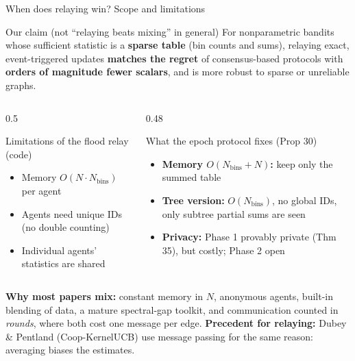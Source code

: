 \documentclass[11pt]{beamer}
\begin{document}
\begin{frame}{When does relaying win? Scope and limitations}
\scriptsize
\begin{block}{Our claim (not ``relaying beats mixing'' in general)}
For nonparametric bandits whose sufficient statistic is a \textbf{sparse table} (bin counts and sums), relaying exact, event-triggered updates \textbf{matches the regret} of consensus-based protocols with \textbf{orders of magnitude fewer scalars}, and is more robust to sparse or unreliable graphs.
\end{block}
\begin{columns}[T]
\begin{column}{0.5\textwidth}
\begin{alertblock}{Limitations of the flood relay (code)}
\begin{itemize}
\item Memory $O(N\cdot N_{\mathrm{bins}})$ per agent
\item Agents need unique IDs (no double counting)
\item Individual agents' statistics are shared
\end{itemize}
\end{alertblock}
\end{column}
\begin{column}{0.48\textwidth}
\begin{block}{What the epoch protocol fixes (Prop 30)}
\begin{itemize}
\item \textbf{Memory $O(N_{\mathrm{bins}}+N)$:} keep only the summed table
\item \textbf{Tree version:} $O(N_{\mathrm{bins}})$, no global IDs, only subtree partial sums are seen
\item \textbf{Privacy:} Phase 1 provably private (Thm 35), but costly; Phase 2 open
\end{itemize}
\end{block}
\end{column}
\end{columns}
\vspace{0.1em}
\scriptsize
\textbf{Why most papers mix:} constant memory in $N$, anonymous agents, built-in blending of data, a mature spectral-gap toolkit, and communication counted in \emph{rounds}, where both cost one message per edge.
\textbf{Precedent for relaying:} Dubey \& Pentland (Coop-KernelUCB) use message passing for the same reason: averaging biases the estimates.
\end{frame}
\end{document}
